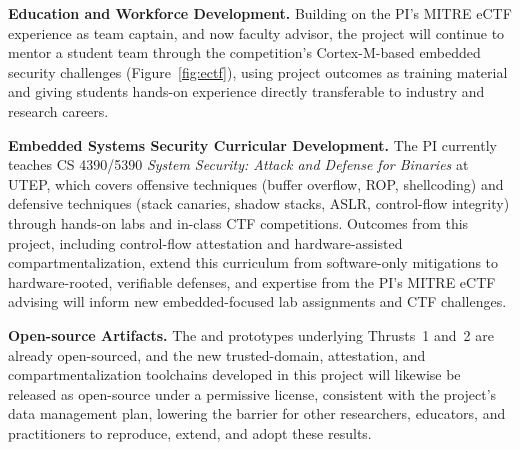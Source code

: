 \textbf{Education and Workforce Development.}
Building on the PI's MITRE eCTF experience as team captain, and now faculty advisor, the project will continue to mentor a student team through the competition's Cortex-M-based embedded security challenges (Figure~\ref{fig:ectf}), using project outcomes as training material and giving students hands-on experience directly transferable to industry and research careers.

\textbf{Embedded Systems Security Curricular Development.}
The PI currently teaches CS 4390/5390 \textit{System Security: Attack and Defense for Binaries} at UTEP, which covers offensive techniques (buffer overflow, ROP, shellcoding) and defensive techniques (stack canaries, shadow stacks, ASLR, control-flow integrity) through hands-on labs and in-class CTF competitions. Outcomes from this project, including control-flow attestation and hardware-assisted compartmentalization, extend this curriculum from software-only mitigations to hardware-rooted, verifiable defenses, and expertise from the PI's MITRE eCTF advising will inform new embedded-focused lab assignments and CTF challenges.

\textbf{Open-source Artifacts.}
The \byotee and \enola prototypes underlying Thrusts~1 and~2 are already open-sourced, and the new trusted-domain, attestation, and compartmentalization toolchains developed in this project will likewise be released as open-source under a permissive license, consistent with the project's data management plan, lowering the barrier for other researchers, educators, and practitioners to reproduce, extend, and adopt these results.
